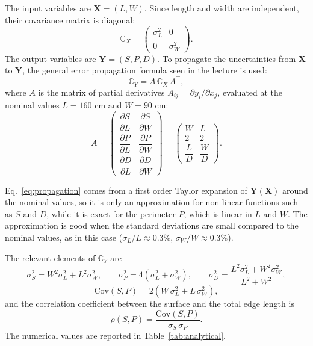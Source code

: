 \documentclass[11pt,a4paper]{article}
\begin{document}
	The input variables are $\mathbf{X} = (L, W)$.
	Since length and width are independent, their covariance matrix is diagonal:
	\begin{equation}
		\mathbb{C}_X =
		\begin{pmatrix}
			\sigma_L^2 & 0 \\
			0 & \sigma_W^2
		\end{pmatrix}.
	\end{equation}
	The output variables are $\mathbf{Y} = (S, P, D)$.
	To propagate the uncertainties from $\mathbf{X}$ to $\mathbf{Y}$, the general error propagation formula seen in the lecture is used:
	\begin{equation}
		\mathbb{C}_Y = A\, \mathbb{C}_X\, A^\intercal ,
		\label{eq:propagation}
	\end{equation}
	where $A$ is the matrix of partial derivatives $A_{ij} = \partial y_i / \partial x_j$, evaluated at the nominal values $L = 160$ cm and $W = 90$ cm:
	\begin{equation}
		A =
		\begin{pmatrix}
			\dfrac{\partial S}{\partial L} & \dfrac{\partial S}{\partial W} \\[2ex]
			\dfrac{\partial P}{\partial L} & \dfrac{\partial P}{\partial W} \\[2ex]
			\dfrac{\partial D}{\partial L} & \dfrac{\partial D}{\partial W}
		\end{pmatrix}
		=
		\begin{pmatrix}
			W & L \\[1ex]
			2 & 2 \\[1ex]
			\dfrac{L}{D} & \dfrac{W}{D}
		\end{pmatrix}.
	\end{equation}
	
	Eq.~\eqref{eq:propagation} comes from a first order Taylor expansion of $\mathbf{Y}(\mathbf{X})$ around the nominal values, so it is only an approximation for non-linear functions such as $S$ and $D$, while it is exact for the perimeter $P$, which is linear in $L$ and $W$.
	The approximation is good when the standard deviations are small compared to the nominal values, as in this case ($\sigma_L / L \approx 0.3\%$, $\sigma_W / W \approx 0.3\%$).
	
	The relevant elements of $\mathbb{C}_Y$ are
	\begin{equation}
		\sigma_S^2 = W^2\sigma_L^2 + L^2\sigma_W^2, \qquad
		\sigma_P^2 = 4\left(\sigma_L^2 + \sigma_W^2\right), \qquad
		\sigma_D^2 = \frac{L^2\sigma_L^2 + W^2\sigma_W^2}{L^2 + W^2},
	\end{equation}
	\begin{equation}
		\mathrm{Cov}(S, P) = 2\left(W\,\sigma_L^2 + L\,\sigma_W^2\right),
	\end{equation}
	and the correlation coefficient between the surface and the total edge length is
	\begin{equation}
		\rho(S, P) = \frac{\mathrm{Cov}(S, P)}{\sigma_S\, \sigma_P}.
	\end{equation}
	The numerical values are reported in Table~\ref{tab:analytical}.
	
\end{document}
